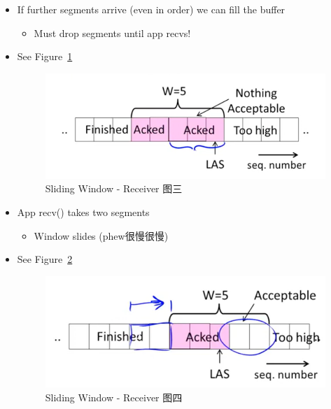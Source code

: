 \documentclass[12pt]{ctexart}   %
\begin{document}
\begin{itemize}
		 \item If further segments arrive (even in order) we can fill the buffer
		 \begin{itemize}
		 	\item Must drop segments until app recvs!
		 \end{itemize}
		 \item See Figure~\ref{fig:6-6-5}
		  
		 \begin{figure}[h!] %
		\centering
		 \includegraphics[scale=0.7]{images/6-6-5}
		\caption{  Sliding Window - Receiver 图三 }
		 \label{fig:6-6-5}
		 \end{figure}
		 
		 \item App recv() takes two segments
		 \begin{itemize}
		 	\item Window slides (phew很慢很慢)
		 \end{itemize}
		  \item See Figure~\ref{fig:6-6-6}
		  
		 \begin{figure}[h!] %
		\centering
		 \includegraphics[scale=0.7]{images/6-6-6}
		\caption{  Sliding Window - Receiver 图四 }
		 \label{fig:6-6-6}
		 \end{figure}
		
	\end{itemize}
	
\end{document}

